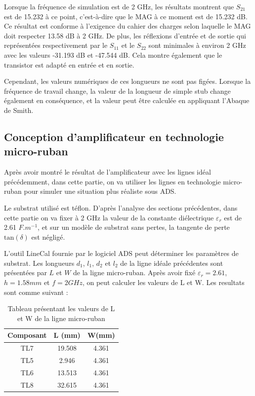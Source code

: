 \documentclass[french]{article}
\begin{document}
Lorsque la fréquence de simulation est de 2 GHz, les résultats montrent que $S_{21}$ est de 15.232 à ce point, c'est-à-dire que le MAG à ce moment est de 15.232 dB. Ce résultat est conforme à l'exigence du cahier des charges selon laquelle le MAG doit respecter 13.58 dB à 2 GHz. De plus, les réflexions d’entrée et de sortie qui représentées respectivement par le $S_{11}$ et le $S_{22}$ sont minimales à environ 2 GHz avec les valeurs -31.193 dB et -47.544 dB. Cela montre également que le transistor est adapté en entrée et en sortie.

Cependant, les valeurs numériques de ces longueurs ne sont pas figées. Lorsque la fréquence de travail change, la valeur de la longueur de simple stub change également en conséquence, et la valeur peut être calculée en appliquant l’Abaque de Smith.

\subsection{Conception d’amplificateur en technologie micro-ruban}
Après avoir montré le résultat de l’amplificateur avec les lignes idéal précédemment, dans cette partie, on va utiliser les lignes en technologie micro-ruban pour simuler une situation plus réaliste sous ADS.

Le substrat utilisé est téflon. D'après l'analyse des sections précédentes, dans cette partie on va fixer à 2 GHz la valeur de la constante diélectrique $\varepsilon_{r}$ est de 2.61 $F.m^{-1}$, et sur un modèle de substrat sans pertes, la tangente de perte $\mbox{tan}(\delta)$ est négligé.

L’outil LineCal fournie par le logiciel ADS peut déterminer les paramètres de substrat. Les longueurs $d_{1}$, $l_{1}$, $d_{2}$ et $l_{2}$ de la ligne idéale précédentes sont présentées par $L$ et $W$ de la ligne micro-ruban. Après avoir fixé $\varepsilon_{r}=2.61$, $h=1.58 mm$ et $f=2 GHz$, on peut calculer les valeurs de L et W. Les resultats sont comme suivant :

\begin{table}[H]
	\centering
	\begin{tabular}{|c|c|c|}
		\hline
		Composant & L (mm) & W(mm) \\
		\hline
		TL7 & 19.508 & 4.361 \\
		\hline
		TL5 & 2.946 & 4.361 \\
		\hline
		TL6 & 13.513 & 4.361 \\
		\hline
		TL8 & 32.615 & 4.361\\
		\hline
	\end{tabular}
	\caption{Tableau présentant les valeurs de L et W de la ligne micro-ruban}
\end{table}
\end{document}
